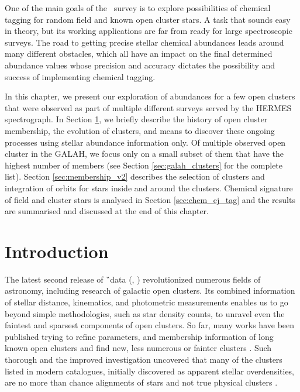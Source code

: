 One of the main goals of the \Gh\ survey is to explore possibilities of chemical tagging for random field and known open cluster stars. A task that sounds easy in theory, but its working applications are far from ready for large spectroscopic surveys. The road to getting precise stellar chemical abundances leads around many different obstacles, which all have an impact on the final determined abundance values whose precision and accuracy dictates the possibility and success of implementing chemical tagging.

In this chapter, we present our exploration of abundances for a few open clusters that were observed as part of multiple different surveys served by the HERMES spectrograph. In Section \ref{sec:intro_tag}, we briefly describe the history of open cluster membership, the evolution of clusters, and means to discover these ongoing processes using stellar abundance information only. Of multiple observed open cluster in the GALAH, we focus only on a small subset of them that have the highest number of members (see Section \ref{sec:galah_clusters} for the complete list). Section \ref{sec:membership_v2} describes the selection of clusters and integration of orbits for stars inside and around the clusters. Chemical signature of field and cluster stars is analysed in Section \ref{sec:chem_ej_tag} and the results are summarised and discussed at the end of this chapter.

\section{Introduction}
\label{sec:intro_tag}
The latest second release of \G\ data (\Gs, \cite{2018A&A...616A...1G}) revolutionized numerous fields of astronomy, including research of galactic open clusters. Its combined information of stellar distance, kinematics, and photometric measurements enables us to go beyond simple methodologies, such as star density counts, to unravel even the faintest and sparsest components of open clusters. So far, many works have been published trying to refine parameters, and membership information of long known open clusters \cite{2017A&A...601A..19G, 2018A&A...618A..93C, 2019A&A...627A..35C} and find new, less numerous or fainter clusters \cite{2019ApJS..245...32L, 2019JKAS...52..145S, 2019A&A...624A.126C, 2020arXiv200107122C}. Such thorough and the improved investigation uncovered that many of the clusters listed in modern catalogues, initially discovered as apparent stellar overdensities, are no more than chance alignments of stars and not true physical clusters \cite{1998A&A...340..402B, 2000A&A...357..145C, 2016AJ....152....7H, 2018MNRAS.480.5242K, 2020A&A...633A..99C}.

